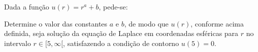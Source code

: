 \linespread{1.5}

Dada a função $u(r) = r^a + b$, pede-se:

Determine o valor das constantes $a$ e $b$, de modo que $u(r)$, conforme acima definida, seja solução da equação de Laplace em coordenadas esféricas para $r$ no intervalo $r\in[5, \infty[$, satisfazendo a condição de contorno $u(5) = 0$.
